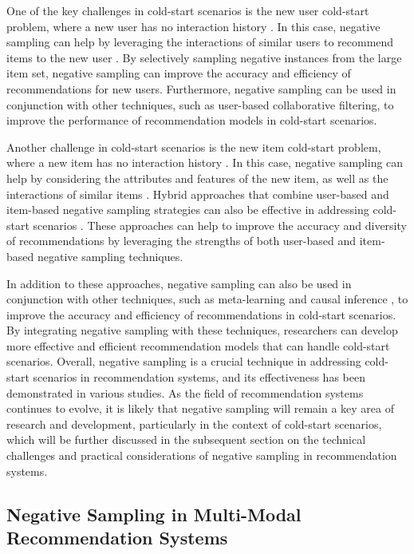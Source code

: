 \documentclass[11pt,a4paper]{article}
\begin{document}
One of the key challenges in cold-start scenarios is the new user cold-start problem, where a new user has no interaction history \cite{doi:10.4028/www.scientific.net/amm.201-202.428}. In this case, negative sampling can help by leveraging the interactions of similar users to recommend items to the new user \cite{doi:10.1609/aaai.v32i1.11835}. By selectively sampling negative instances from the large item set, negative sampling can improve the accuracy and efficiency of recommendations for new users. Furthermore, negative sampling can be used in conjunction with other techniques, such as user-based collaborative filtering, to improve the performance of recommendation models in cold-start scenarios.

Another challenge in cold-start scenarios is the new item cold-start problem, where a new item has no interaction history \cite{doi:10.1016/j.knosys.2011.07.021}. In this case, negative sampling can help by considering the attributes and features of the new item, as well as the interactions of similar items \cite{doi:10.1155/2019/2072375}. Hybrid approaches that combine user-based and item-based negative sampling strategies can also be effective in addressing cold-start scenarios \cite{doi:10.1109/icdm.2016.0030}. These approaches can help to improve the accuracy and diversity of recommendations by leveraging the strengths of both user-based and item-based negative sampling techniques.

In addition to these approaches, negative sampling can also be used in conjunction with other techniques, such as meta-learning \cite{arxiv:2206.04415} and causal inference \cite{arxiv:2208.12397}, to improve the accuracy and efficiency of recommendations in cold-start scenarios. By integrating negative sampling with these techniques, researchers can develop more effective and efficient recommendation models that can handle cold-start scenarios. Overall, negative sampling is a crucial technique in addressing cold-start scenarios in recommendation systems, and its effectiveness has been demonstrated in various studies. As the field of recommendation systems continues to evolve, it is likely that negative sampling will remain a key area of research and development, particularly in the context of cold-start scenarios, which will be further discussed in the subsequent section on the technical challenges and practical considerations of negative sampling in recommendation systems.


\subsection{Negative Sampling in Multi-Modal Recommendation Systems}
\end{document}
